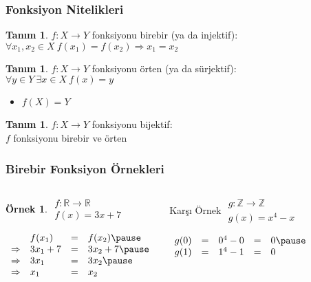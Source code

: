 \documentclass[dvipsnames]{beamer}
\theoremstyle{definition}
\newtheorem{tanim}[theorem]{Tanım}
\theoremstyle{example}
\newtheorem{ornek}[theorem]{Örnek}
\theoremstyle{plain}
\begin{document}
\begin{frame}
  \frametitle{Fonksiyon Nitelikleri}

  \begin{tanim}
    $f: X \rightarrow Y$ fonksiyonu \alert{birebir} (ya da \alert{injektif}):\\
      $\forall x_1,x_2 \in X~f(x_1)=f(x_2) \Rightarrow x_1=x_2$
  \end{tanim}

  \pause
  \begin{tanim}
    $f: X \rightarrow Y$ fonksiyonu \alert{örten} (ya da \alert{sürjektif}):\\
    $\forall y \in Y~\exists x \in X~f(x)=y$

    \begin{itemize}
      \item $f(X)=Y$
    \end{itemize}
  \end{tanim}

  \pause
  \begin{tanim}
    $f: X \rightarrow Y$ fonksiyonu \alert{bijektif}:\\
    $f$ fonksiyonu birebir ve örten
  \end{tanim}
\end{frame}

\begin{frame}
  \frametitle{Birebir Fonksiyon Örnekleri}

  \begin{columns}[t]
    \begin{ornek}
      $\begin{array}{l}
        f: \mathbb{R} \rightarrow \mathbb{R}\\
        f(x) = 3x + 7
      \end{array}$

      \pause
      \bigskip
      $\begin{array}{llll}
                    & f(x_1)    & = & f(x_2)\pause\\
        \Rightarrow & 3 x_1 + 7 & = & 3 x_2 + 7\pause\\
        \Rightarrow & 3 x_1     & = & 3 x_2\pause\\
        \Rightarrow & x_1       & = & x_2
      \end{array}$
    \end{ornek}

    \pause
    \begin{block}{Karşı Örnek}
      $\begin{array}{l}
        g: \mathbb{Z} \rightarrow \mathbb{Z}\\
        g(x) = x^4 - x
      \end{array}$

      \pause
      \bigskip
      $\begin{array}{lllll}
        g(0) & = & 0^4 - 0 & = & 0\pause\\
        g(1) & = & 1^4 - 1 & = & 0
      \end{array}$
    \end{block}
  \end{columns}
\end{frame}
\end{document}
